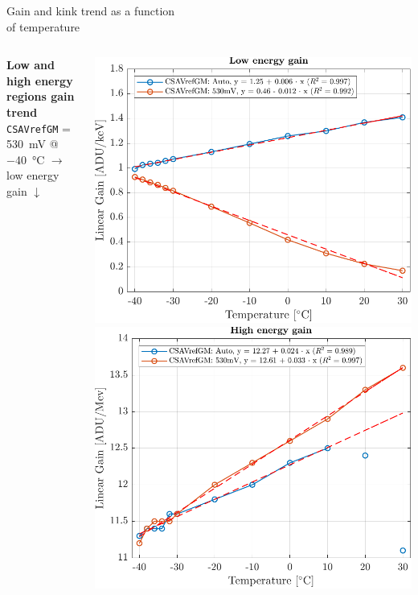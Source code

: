 \documentclass[aspectratio=169,xcolor=dvipsnames]{beamer}
\begin{document}
\begin{frame}{Gain and kink trend as a function\\ \vskip-0.15cm of temperature}
\begin{columns}
            \addtolength{\leftmargini}{\labelsep}

            \textbf{Low and high energy regions gain trend}\\
            \vspace{0.1cm}
            \texttt{CSAVrefGM} = \SI{530}{\milli\volt} @ \SI{-40}{\celsius} $\rightarrow$ low energy gain $\downarrow$
            \vspace{-0.2cm}
            \begin{center}
                \includegraphics[height=0.32\textheight]{images/temperature_effects/low_energy_gain_auto_530mV.pdf}
                \includegraphics[height=0.32\textheight]{images/temperature_effects/high_energy_gain_auto_530mV.pdf}
            \end{center}


\end{columns}
\end{frame}
\end{document}
